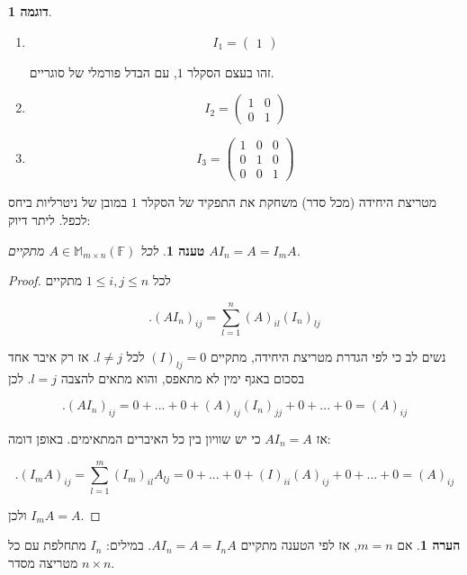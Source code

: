 \documentclass[12pt]{report}
\theoremstyle{plain}
\newtheorem{proposition}[theorem]{טענה}
\theoremstyle{definition}
\newtheorem{example}{דוגמה}[chapter]
\newtheorem{remark}{הערה}[chapter]
\newcommand{\F}{\mathbb{F}}
\newcommand{\M}{\mathbb{M}}
\newcommand{\0}{\mathbf{0}}
\begin{document}
\begin{example}\
\begin{enumerate}[label=\alph*.]
\item 
$$I_1=\begin{pmatrix}1\end{pmatrix}$$

זהו בעצם הסקלר 
$1$,
עם הבדל פורמלי של סוגריים.


\item 
$$
I_2=
\begin{pmatrix}
1 &0 \\
0 &1
\end{pmatrix}
$$


\item 
$$
I_3=
\begin{pmatrix}
1 &0 &0 \\
0 &1 &0 \\
0 &0 &1
\end{pmatrix}
$$


\end{enumerate}
\end{example}

מטריצת היחידה (מכל סדר) משחקת את התפקיד של הסקלר
$1$
במובן של ניטרליות ביחס לכפל. ליתר דיוק:

\begin{proposition}
לכל 
$A\in\M_{m\times n}(\F)$
מתקיים
$AI_n=A=I_m A$.
\end{proposition}

\begin{proof}

לכל
$1\leq i,j \leq n$
מתקיים

$$
.(AI_n)_{ij}=\sum_{l=1}^n (A)_{il}(I_n)_{lj}
$$

נשים לב כי לפי הגדרת מטריצת היחידה, מתקיים
$(I)_{lj}=0$
לכל
$l\neq j$.
אז רק איבר אחד בסכום באגף ימין לא מתאפס, והוא מתאים להצבה
$l=j$. 
לכן

$$
.(AI_n)_{ij}=0+...+0+(A)_{ij}(I_n)_{jj}+0+...+0=(A)_{ij}
$$

אז 
$AI_n=A$
כי יש שוויון בין כל האיברים המתאימים. באופן דומה:

$$
.(I_m A)_{ij}=\sum_{l=1}^m (I_m)_{il}A_{lj}=0+...+0+(I)_{ii}(A)_{ij}+0+...+0=(A)_{ij}
$$

ולכן
$I_m A=A$.

\end{proof}

\begin{remark}
אם
$m=n$,
אז לפי הטענה מתקיים
$AI_n=A=I_nA$.
במילים: 
$I_n$
מתחלפת עם כל מטריצה מסדר 
$n\times n$.
\end{remark}
\end{document}
